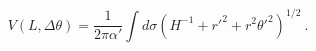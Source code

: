 \begin{equation}
V(L,\Delta \theta)=\frac{1}{2\pi\alpha'}\int d\sigma (H^{-1}+ r'^2+ r^2  
\theta'^2)^{1/2}\ .
\end{equation}

